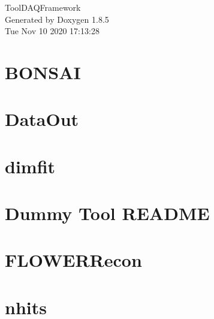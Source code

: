 \documentclass[twoside]{book}
\newcommand{\clearemptydoublepage}{%
  \newpage{\pagestyle{empty}\cleardoublepage}%
}
\begin{document}
\hypersetup{pageanchor=false}
\begin{titlepage}
\vspace*{7cm}
\begin{center}%
{\Large Tool\-D\-A\-Q\-Framework }\\
\vspace*{1cm}
{\large Generated by Doxygen 1.8.5}\\
\vspace*{0.5cm}
{\small Tue Nov 10 2020 17:13:28}\\
\end{center}
\end{titlepage}
\clearemptydoublepage
\tableofcontents
\clearemptydoublepage
{}
\hypersetup{pageanchor=true}

\chapter{B\-O\-N\-S\-A\-I}
\label{md_UserTools_BONSAI_README}
\hypertarget{md_UserTools_BONSAI_README}{}

\chapter{Data\-Out}
\label{md_UserTools_DataOut_README}
\hypertarget{md_UserTools_DataOut_README}{}

\chapter{dimfit}
\label{md_UserTools_dimfit_README}
\hypertarget{md_UserTools_dimfit_README}{}

\chapter{Dummy Tool R\-E\-A\-D\-M\-E}
\label{md_UserTools_DummyTool_README}
\hypertarget{md_UserTools_DummyTool_README}{}

\chapter{F\-L\-O\-W\-E\-R\-Recon}
\label{md_UserTools_FLOWERRecon_README}
\hypertarget{md_UserTools_FLOWERRecon_README}{}

\chapter{nhits}
\label{md_UserTools_nhits_README}
\hypertarget{md_UserTools_nhits_README}{}

\end{document}
